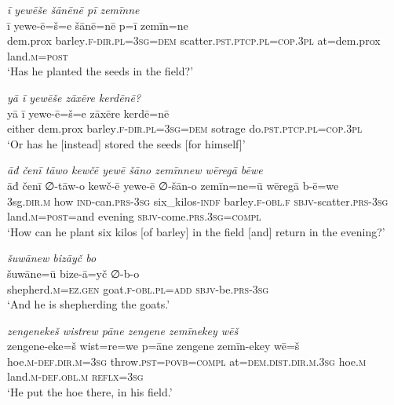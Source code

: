 \ea \label{ŽP.44}
\textit{ī yewēše šānēnē pī zemīnne} \\ 
\gll ī yewe-ē=š=e šānē=nē p=ī zemīn=ne \\ 
 dem.prox barley\textsc{.f}\textsc{-dir}\textsc{.pl}\textsc{=3sg}\textsc{=dem} scatter\textsc{.pst}\textsc{.ptcp}\textsc{.pl}\textsc{=cop}\textsc{.3pl} at=dem.prox land\textsc{.m}\textsc{=\textsc{post}} \\ 
\glt `Has he planted the seeds in the field?'
\z 
 
\ea \label{ŽP.45}
\textit{yā ī yewēše zāxēre kerdēnē?} \\ 
\gll yā ī yewe-ē=š=e zāxēre kerdē=nē \\ 
 either dem.prox barley\textsc{.f}\textsc{-dir}\textsc{.pl}\textsc{=3sg}\textsc{=dem} sotrage do\textsc{.pst}\textsc{.ptcp}\textsc{.pl}\textsc{=cop}\textsc{.3pl} \\ 
\glt `Or has he [instead] stored the seeds [for himself]'
\z 
 
\ea \label{ŽP.46}
\textit{āđ čenī tāwo kewčē yewē šāno zemīnnew wēregā bēwe} \\ 
\gll āđ čenī ∅-tāw-o kewč-ē yewe-ē ∅-šān-o zemīn=ne=ū wēregā b-ē=we \\ 
 3sg\textsc{.dir}\textsc{.m} how \textsc{ind-}can\textsc{.prs}\textsc{-3sg} six\_kilos\textsc{-indf} barley\textsc{.f}\textsc{-obl}\textsc{.f} \textsc{sbjv-}scatter\textsc{.prs}\textsc{-3sg} land\textsc{.m}\textsc{=\textsc{post}}=and evening \textsc{sbjv-}come\textsc{.prs}\textsc{.3sg}\textsc{=compl} \\ 
\glt `How can he plant six kilos [of barley] in the field [and] return in the evening?'
\z 
 
\ea \label{ŽP.48}
\textit{šuwānew bizāyč bo} \\ 
\gll šuwāne=ū bize-ā=yč ∅-b-o \\ 
 shepherd\textsc{.m}\textsc{\textsc{=ez.gen}} goat\textsc{.f}\textsc{-obl}\textsc{.pl}\textsc{=add} \textsc{sbjv-}be\textsc{.prs}\textsc{-3sg} \\ 
\glt `And he is shepherding the goats.'
\z 
 
\ea \label{ŽP.52}
\textit{zengenekeš wistrew pāne zengene zemīnekey wēš} \\ 
\gll zengene-eke=š wist=re=we p=āne zengene zemīn-ekey wē=š \\ 
 hoe\textsc{.m}\textsc{-def}\textsc{.dir}\textsc{.m}\textsc{=3sg} throw\textsc{.pst}\textsc{=\textsc{povb}}\textsc{=compl} at=\textsc{dem.dist}\textsc{.dir}\textsc{.m}\textsc{.3sg} hoe\textsc{.m} land\textsc{.m}\textsc{-def}\textsc{.obl}\textsc{.m} \textsc{reflx}\textsc{=3sg} \\ 
\glt `He put the hoe there, in his field.'
\z 
 
